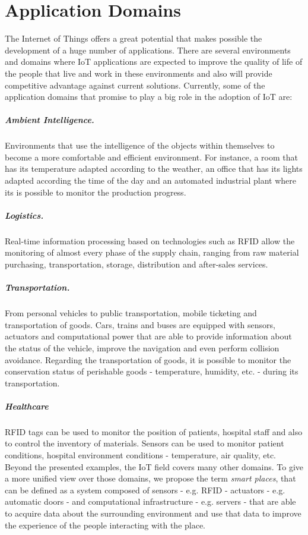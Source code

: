 \section{Application Domains}
\label{sec:application_domains}
The Internet of Things offers a great potential that makes possible the development of a huge number
of applications. There are several environments and domains where \gls{IoT} applications are expected
to improve the quality of life of the people that live and work in these environments and also
will provide competitive advantage against current solutions. Currently, some of the application
domains that promise to play a big role in the adoption of \gls{IoT} are:

\subparagraph{Ambient Intelligence.} Environments that use the intelligence of the objects within
themselves to become a more comfortable and efficient environment. For instance, a room that has its
temperature adapted according to the weather, an office that has its lights adapted according the time
of the day and an automated industrial plant where its is possible to monitor the production progress.
\subparagraph{Logistics.} Real-time information processing based on technologies such as \gls{RFID}
allow the monitoring of almost every phase of the supply chain, ranging from raw material
purchasing, transportation, storage, distribution and after-sales services.
\subparagraph{Transportation.} From personal vehicles to public transportation, mobile ticketing
and transportation of goods. Cars, trains and buses are equipped with sensors, actuators and computational
power that are able to provide information about the status of the vehicle, improve the navigation and
even perform collision avoidance. Regarding the transportation of goods, it is possible to monitor
the conservation status of perishable goods - temperature, humidity, etc. -  during its transportation.
\subparagraph{Healthcare} \gls{RFID} tags can be used to monitor the position of patients,
hospital staff and also to control the inventory of materials. Sensors can be used to monitor
patient conditions, hospital environment conditions - temperature, air quality, etc.\\

Beyond the presented examples, the \gls{IoT} field covers many other domains. To give a more unified
view over those domains, we propose the term \textit{smart places}, that can be defined as a system
composed of sensors - e.g. RFID - actuators - e.g. automatic doors - and computational infrastructure
- e.g. servers - that are able to acquire data about the surrounding environment and use that data to
improve the experience of the people interacting with the place.

